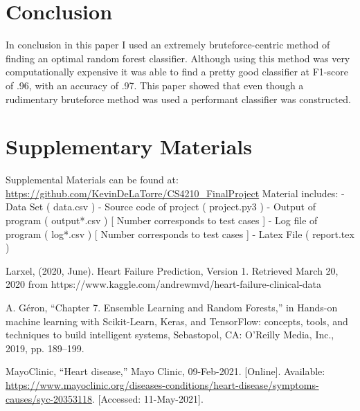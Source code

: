\documentclass[conference]{IEEEtran}
\begin{document}
\section{Conclusion}
In conclusion in this paper I used an extremely bruteforce-centric method of finding an optimal random forest classifier. Although using this method was very computationally expensive it was able to find a pretty good classifier at F1-score of .96, with an accuracy of .97. This paper showed that even though a rudimentary bruteforce method was used a performant classifier was constructed.

\section{Supplementary Materials}
Supplemental Materials can be found at:
\newline
\url{https://github.com/KevinDeLaTorre/CS4210_FinalProject}
\newline
Material includes:\newline
- Data Set ( data.csv )\newline
- Source code of project ( project.py3 )\newline 
- Output of program ( output*.csv ) [ Number corresponds to test cases ]\newline
- Log file of program ( log*.csv ) [ Number corresponds to test cases ]\newline
- Latex File ( report.tex )\newline
\begin{thebibliography}{1}

Larxel, (2020, June). Heart Failure Prediction, Version 1. Retrieved March 20, 2020 from https://www.kaggle.com/andrewmvd/heart-failure-clinical-data

A. Géron, “Chapter 7. Ensemble Learning and Random Forests,” in Hands-on machine learning with Scikit-Learn, Keras, and TensorFlow: concepts, tools, and techniques to build intelligent systems, Sebastopol, CA: O'Reilly Media, Inc., 2019, pp. 189–199. 

MayoClinic, “Heart disease,” Mayo Clinic, 09-Feb-2021. [Online]. Available: \url{https://www.mayoclinic.org/diseases-conditions/heart-disease/symptoms-causes/syc-20353118}. [Accessed: 11-May-2021]. 

\end{thebibliography}
\end{document}

